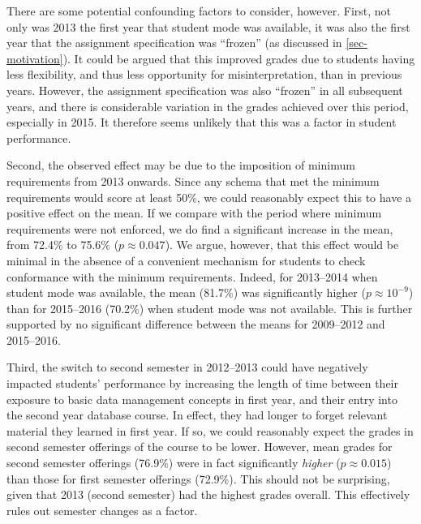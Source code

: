 \documentclass[sigconf, review, anonymous, capitalise]{acmart}
\begin{document}
There are some potential confounding factors to consider, however. First, not only was 2013 the first year that student mode was available, it was also the first year that the assignment specification was ``frozen'' (as discussed in \cref{sec-motivation}). It could be argued that this improved grades due to students having less flexibility, and thus less opportunity for misinterpretation, than in previous years. However, the assignment specification was also ``frozen'' in all subsequent years, and there is considerable variation in the grades achieved over this period, especially in 2015. It therefore seems unlikely that this was a factor in student performance.

Second, the observed effect may be due to the imposition of minimum requirements from 2013 onwards. Since any schema that met the minimum requirements would score at least 50\%, we could reasonably expect this to have a positive effect on the mean. If we compare with the period where minimum requirements were not enforced, we do find a significant increase in the mean, from 72.4\% to 75.6\% (\(p \approx 0.047\)). We argue, however, that this effect would be minimal in the absence of a convenient mechanism for students to check conformance with the minimum requirements. Indeed, for 2013--2014 when student mode was available, the mean (81.7\%) was significantly higher (\(p \approx 10^{-9}\)) than for 2015--2016 (70.2\%) when student mode was not available. This is further supported by no significant difference between the means for 2009--2012 and 2015--2016.

Third, the switch to second semester in 2012--2013 could have negatively impacted students' performance by increasing the length of time between their exposure to basic data management concepts in first year, and their entry into the second year database course. In effect, they had longer to forget relevant material they learned in first year. If so, we could reasonably expect the grades in second semester offerings of the course to be lower. However, mean grades for second semester offerings (76.9\%) were in fact significantly \emph{higher} (\(p \approx 0.015\)) than those for first semester offerings (72.9\%). This should not be surprising, given that 2013 (second semester) had the highest grades overall. This effectively rules out semester changes as a factor.
\end{document}
